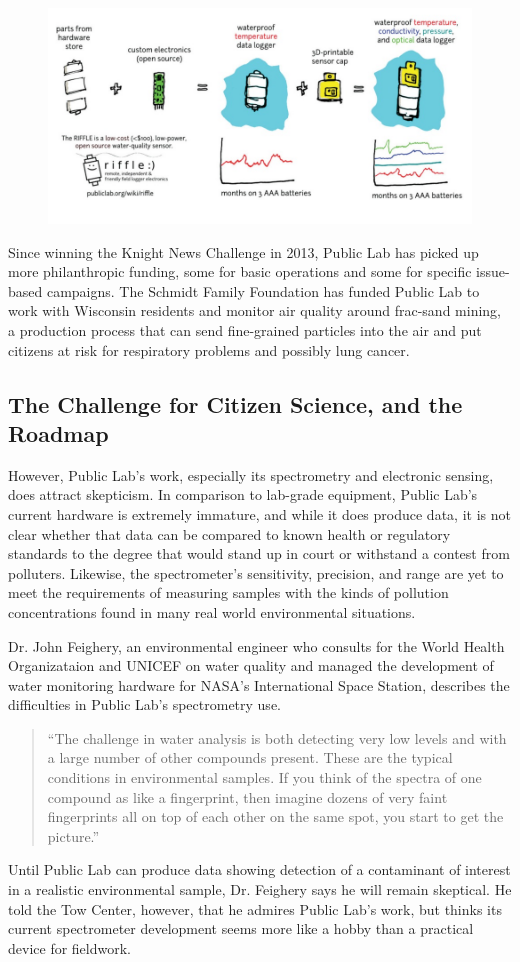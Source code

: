     \begin{figure}
    \includegraphics{images/PublicLabRiffle.jpg}
    \end{figure}

Since winning the Knight News Challenge in 2013, Public Lab has picked up
more philanthropic funding, some for basic operations and some for specific
issue-based campaigns. The Schmidt Family Foundation has funded
Public Lab to work with Wisconsin residents and monitor air quality around
frac-sand mining, a production process that can send fine-grained particles
into the air and put citizens at risk for respiratory problems and possibly
lung cancer.

\subsection{The Challenge for Citizen Science, and the Roadmap}
However, Public Lab's work, especially its spectrometry and electronic
sensing, does attract skepticism. In comparison to lab-grade equipment,
Public Lab's current hardware is extremely immature, and while it does
produce data, it is not clear whether that data can be compared to known
health or regulatory standards to the degree that would stand up in court or
withstand a contest from polluters. Likewise, the spectrometer's sensitivity,
precision, and range are yet to meet the requirements of measuring samples
with the kinds of pollution concentrations found in many real world environmental
situations.

Dr. John Feighery, an environmental engineer who consults for the World
Health Organizataion and UNICEF on water quality and managed the
development of water monitoring hardware for NASA's International Space
Station, describes the difficulties in Public Lab's spectrometry use. 
\begin{quote}
``The
challenge in water analysis is both detecting very low levels and with a large
number of other compounds present. These are the typical conditions in
environmental samples. If you think of the spectra of one compound as
like a fingerprint, then imagine dozens of very faint fingerprints all on top
of each other on the same spot, you start to get the picture.'' 
\end{quote}
Until Public Lab can produce data showing detection of a contaminant of interest in a
realistic environmental sample, Dr. Feighery says he will remain skeptical.
He told the Tow Center, however, that he admires Public Lab's work, but
thinks its current spectrometer development seems more like a hobby than
a practical device for fieldwork.

